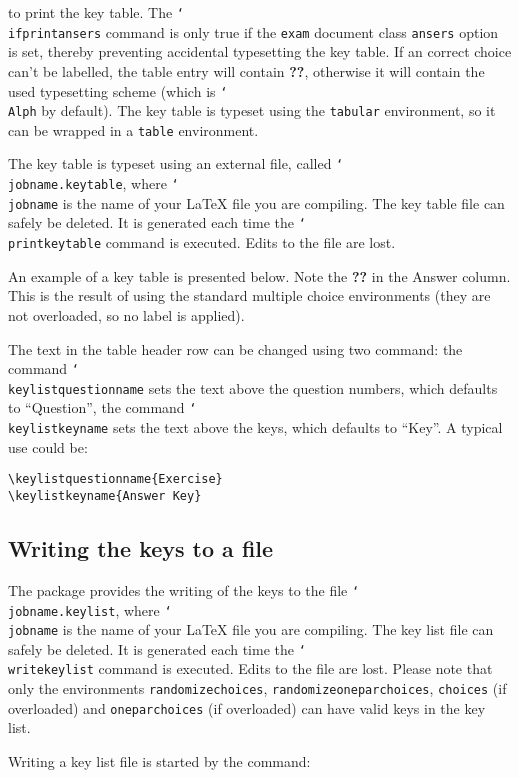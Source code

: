 \documentclass[12pt,a4paper]{exam}
\providecommand{\texorpdfstring}[2]{#1}
\newcommand{\bs}{\texorpdfstring{\char`\\}{}}
\begin{document}
to print the key table. The \texttt{\bs ifprintansers} command is only true if the
\texttt{exam} document class \texttt{ansers} option is set, thereby preventing
accidental typesetting the key table. If an correct choice can't be labelled, the
table entry will contain \textbf{??}, otherwise it will contain the used typesetting scheme
(which is \texttt{\bs Alph} by default).
The key table is typeset using the \texttt{tabular}
environment, so it can be wrapped in a \texttt{table} environment.

The key table is typeset using an external file, called \texttt{\bs jobname.keytable},
where \texttt{\bs jobname} is the name of your \LaTeX{} file you are compiling.
The key table file can safely be deleted. It is generated each time the
\texttt{\bs printkeytable} command is executed. Edits to the file are lost.

An example of a key table is presented below. Note the \textbf{??} in the
Answer column. This is the result of using the standard multiple choice
environments (they are not overloaded, so no label is applied).

\printkeytable

The text in the table header row can be changed using two command: the command
\texttt{\bs keylistquestionname} sets the text above the question numbers, which
defaults to ``Question'', the command \texttt{\bs keylistkeyname} sets the text
above the keys, which defaults to ``Key''. A typical use could be:

\begin{lstlisting}
\keylistquestionname{Exercise}
\keylistkeyname{Answer Key}
\end{lstlisting}

\subsection{Writing the keys to a file}
The package provides the writing of the keys to the file \texttt{\bs jobname.keylist},
where \texttt{\bs jobname} is the name of your \LaTeX{} file you are compiling.
The key list file can safely be deleted. It is generated each time the
\texttt{\bs writekeylist} command is executed. Edits to the file are lost.
Please note that only the environments \texttt{randomizechoices},
\texttt{randomizeoneparchoices}, \texttt{choices} (if overloaded) and
\texttt{oneparchoices} (if overloaded) can have valid keys in the key list.

Writing a key list file is started by the command:
\end{document}
